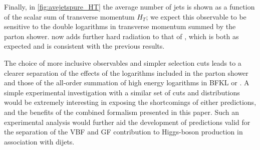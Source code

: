 
Finally, in \cref{fig:avejetspure_HT} the average number of jets is shown
as a function of the scalar sum of transverse momentum $H_T$; we expect this observable to 
be sensitive to the double logarithms in transverse momentum summed by the parton shower.
\py now adds further hard radiation to that of \HEJ, which is both as expected 
and is consistent with the previous results. 

The choice of more inclusive observables and simpler selection cuts leads to a clearer
separation of the effects of the logarithms included in the parton shower and
those of the all-order summation of high energy logarithms in BFKL or \HEJ.
A simple experimental investigation with a similar set of cuts and distributions 
would be extremely interesting in exposing
the shortcomings of either predictions, and the benefits of the combined
formalism presented in this paper. Such an experimental analysis would
further aid the development of predictions valid for the separation of the
VBF and GF contribution to Higgs-boson production in association with dijets.




